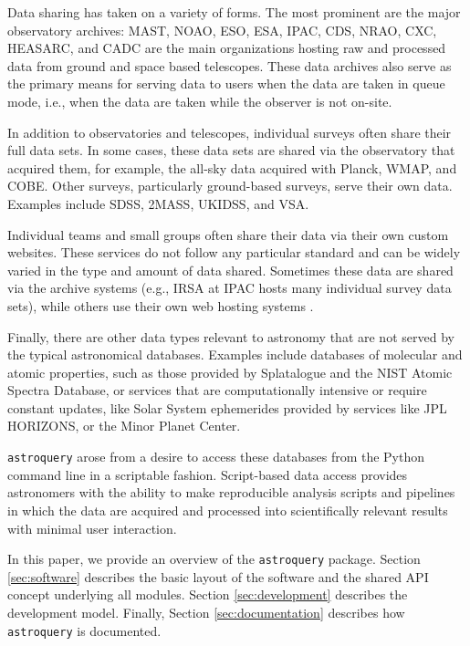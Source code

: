 \documentclass[twocolumn]{aastex62}
\newcommand{\package}[1]{\texttt{#1}\xspace}
\newcommand{\astroquery}{\package{astroquery}}
\begin{document}
Data sharing has taken on a variety of forms.  The most prominent are the
major observatory archives: MAST, NOAO, ESO, ESA, IPAC, CDS, NRAO, CXC, HEASARC,
and CADC are the main organizations hosting raw and processed data from
ground and space based telescopes.  These data archives also serve as the
primary means for serving data to users when the data are taken in queue
mode, i.e., when the data are taken while the observer is not on-site.

In addition to observatories and telescopes, individual surveys often share
their full data sets.  In some cases, these data sets are shared via the
observatory that acquired them, for example, the all-sky data acquired with
Planck, WMAP, and COBE\@.  Other surveys, particularly ground-based surveys,
serve their own data.  Examples include SDSS, 2MASS, UKIDSS, and VSA.


Individual teams and small groups often share their data via their own
custom websites.  These services do not follow any particular standard and can
be widely varied in the type and amount of data shared.  Sometimes these data
are shared via the archive systems (e.g., IRSA at IPAC hosts many individual
survey data sets), while others use their own web hosting systems \citep[e.g.,
MAGPIS;][]{Helfand2006}.

Finally, there are other data types relevant to astronomy that are not
served by the typical astronomical databases.  Examples include databases of
molecular and atomic properties, such as those provided by Splatalogue and
the NIST Atomic Spectra Database, or services that are computationally
intensive or require constant updates, like Solar System ephemerides
provided by services like JPL HORIZONS, or the Minor Planet Center.

\astroquery arose from a desire to access these databases from the Python command line
in a scriptable fashion.  Script-based data access provides astronomers with
the ability to make reproducible analysis scripts and pipelines in which the data are
acquired and processed into scientifically relevant results with minimal
user interaction.

In this paper, we provide an overview of the \astroquery package.  Section
\ref{sec:software} describes the basic layout of the software and the shared
API concept underlying all modules.  Section \ref{sec:development} describes
the development model.  Finally, Section \ref{sec:documentation} describes how
\astroquery is documented.
\end{document}
